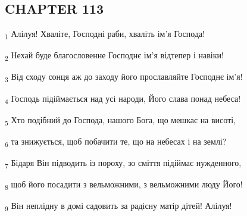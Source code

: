 \subsection{CHAPTER 113}
\begin{tcolorbox}
\textsubscript{1} Алілуя! Хваліте, Господні раби, хваліть ім'я Господа!
\end{tcolorbox}
\begin{tcolorbox}
\textsubscript{2} Нехай буде благословенне Господнє ім'я відтепер і навіки!
\end{tcolorbox}
\begin{tcolorbox}
\textsubscript{3} Від сходу сонця аж до заходу його прославляйте Господнє ім'я!
\end{tcolorbox}
\begin{tcolorbox}
\textsubscript{4} Господь підіймається над усі народи, Його слава понад небеса!
\end{tcolorbox}
\begin{tcolorbox}
\textsubscript{5} Хто подібний до Господа, нашого Бога, що мешкає на висоті,
\end{tcolorbox}
\begin{tcolorbox}
\textsubscript{6} та знижується, щоб побачити те, що на небесах і на землі?
\end{tcolorbox}
\begin{tcolorbox}
\textsubscript{7} Бідаря Він підводить із пороху, зо сміття підіймає нужденного,
\end{tcolorbox}
\begin{tcolorbox}
\textsubscript{8} щоб його посадити з вельможними, з вельможними люду Його!
\end{tcolorbox}
\begin{tcolorbox}
\textsubscript{9} Він неплідну в домі садовить за радісну матір дітей! Алілуя!
\end{tcolorbox}
